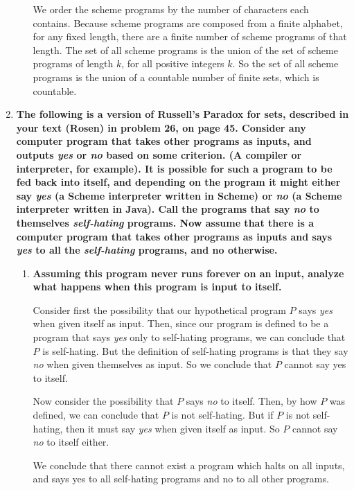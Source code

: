 \documentclass[12pt]{amsart}
\begin{document}
\begin{enumerate}
\begin{enumerate}
We order the scheme programs by the number of characters each
contains.  Because scheme programs are composed from a finite
alphabet, for any fixed length, there are a finite number of scheme
programs of that length.  The set of all scheme programs is the union
of the set of scheme programs of length $k$, for all positive integers
$k$.  So the set of all scheme programs is the union of a countable
number of finite sets, which is countable.
\end{enumerate}

\medskip

\item {\bf The following is a version of Russell's Paradox for sets, described in your text (Rosen) in problem 26, on page 45.  Consider any computer program that takes other programs as inputs, and outputs {\em yes} or {\em no} based on some criterion.  (A compiler or interpreter, for example).  It is possible for such a program to be fed back into itself, and depending on the program it might either say {\em yes} (a Scheme interpreter written in Scheme) or {\em no} (a Scheme interpreter written in Java).  Call the programs that say {\em no} to themselves {\em self-hating} programs.  Now assume that there is a computer program that takes other programs as inputs and says {\em yes} to all the {\em self-hating} programs, and no otherwise.}

\begin{enumerate}
\item {\bf Assuming this program never runs forever on an input, analyze what happens when this program is input to itself.}

Consider first the possibility that our hypothetical program $P$ says
{\em yes} when given itself as input.  Then, since our program is
defined to be a program that says {\em yes} only to self-hating
programs, we can conclude that $P$ is self-hating.  But the definition
of self-hating programs is that they say {\em no} when given
themselves as input.  So we conclude that $P$ cannot say yes to
itself.

Now consider the possibility that $P$ says {\em no} to itself.  Then,
by how $P$ was defined, we can conclude that $P$ is not self-hating.
But if $P$ is not self-hating, then it must say {\em yes} when given
itself as input.  So $P$ cannot say {\em no} to itself either.

We conclude that there cannot exist a program which halts on all
inputs, and says yes to all self-hating programs and no to all other
programs.


\end{enumerate}
\end{enumerate}
\end{document}
